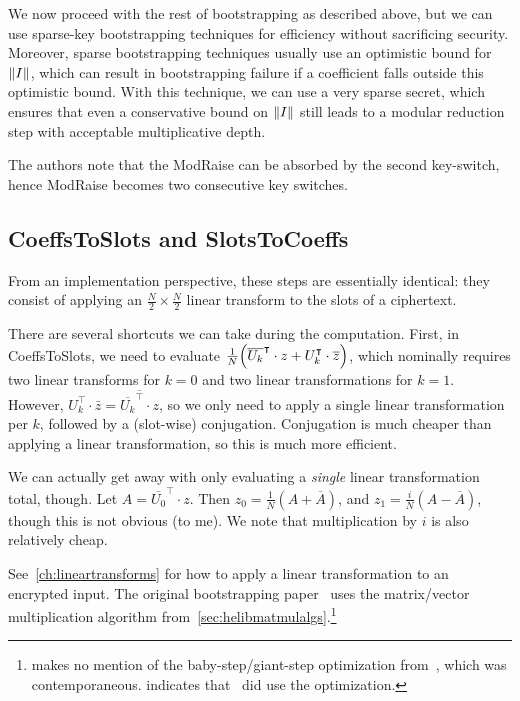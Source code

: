 \documentclass[../fheimpl.tex]{subfiles}
\begin{document}
    We now proceed with the rest of bootstrapping as described above, but we can use sparse-key bootstrapping techniques for efficiency without sacrificing security. Moreover, sparse bootstrapping techniques usually use an optimistic bound for $\lVert I\rVert$, which can result in bootstrapping failure if a coefficient falls outside this optimistic bound. With this technique, we can use a very sparse secret, which ensures that even a conservative bound on $\lVert I\rVert$ still leads to a modular reduction step with acceptable multiplicative depth.
    
    The authors note that the ModRaise can be absorbed by the second key-switch, hence ModRaise becomes two consecutive key switches.
	
    \subsection{CoeffsToSlots and SlotsToCoeffs}
    From an implementation perspective, these steps are essentially identical: they consist of applying an $\frac{N}{2}\times \frac{N}{2}$ linear transform to the slots of a ciphertext.
    
    There are several shortcuts we can take during the computation. First, in CoeffsToSlots, we need to evaluate $\frac{1}{N}\parens*{\overline{U_k}^\intercal\cdot z + U_k^\intercal\cdot\overline{z}}$, which nominally requires two linear transforms for $k=0$ and two linear transformations for $k=1$. However, $U_k^\intercal\cdot\bar{z} = \overline{\overline{U_k}^\intercal\cdot z}$, so we only need to apply a single linear transformation per $k$, followed by a (slot-wise) conjugation. Conjugation is much cheaper than applying a linear transformation, so this is much more efficient.
    
    We can actually get away with only evaluating a \emph{single} linear transformation total, though. Let $A=\overline{U_0}^\intercal\cdot z$. Then $z_0=\frac{1}{N}(A+\overline{A})$, and $z_1 = \frac{i}{N}(A-\overline{A})$, though this is not obvious (to me). We note that multiplication by $i$ is also relatively cheap.
    
    See~\cref{ch:lineartransforms} for how to apply a linear transformation to an encrypted input. The original bootstrapping paper~\cite{cryptoeprint:2018/153} uses the matrix/vector multiplication algorithm from~\cref{sec:helibmatmulalgs}.\footnote{\cite{cryptoeprint:2018/153} makes no mention of the baby-step/giant-step optimization from~\cite{cryptoeprint:2018/244}, which was contemporaneous. \cite{cryptoeprint:2018/1043} indicates that~\cite{cryptoeprint:2018/153} did use the optimization.}
    
\end{document}
